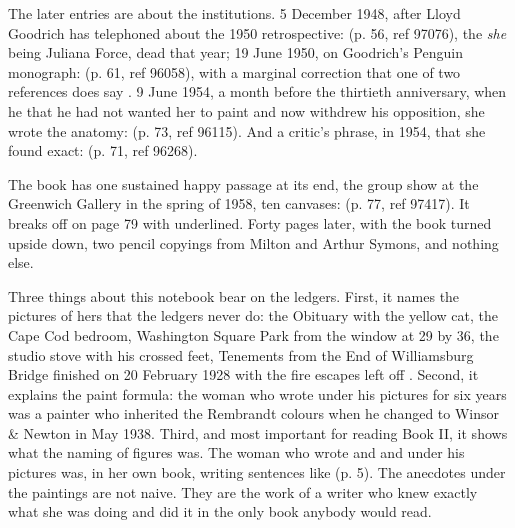 The later entries are about the institutions. 5 December 1948, after Lloyd Goodrich has telephoned about the 1950 retrospective:  (p. 56, ref 97076), the \emph{she} being Juliana Force, dead that year;  19 June 1950, on Goodrich's Penguin monograph:  (p. 61, ref 96058), with a marginal correction that one of two references does say . 9 June 1954, a month before the thirtieth anniversary, when he  that he had not wanted her to paint and now withdrew his opposition, she wrote the anatomy:  (p. 73, ref 96115). And a critic's phrase, in 1954, that she found exact:  (p. 71, ref 96268).

The book has one sustained happy passage at its end, the group show at the Greenwich Gallery in the spring of 1958, ten canvases:  (p. 77, ref 97417). It breaks off on page 79 with  underlined. Forty pages later, with the book turned upside down, two pencil copyings from Milton and Arthur Symons, and nothing else.

Three things about this notebook bear on the ledgers. First, it names the pictures of hers that the ledgers never do: the Obituary with the yellow cat, the Cape Cod bedroom, Washington Square Park from the window at 29 by 36, the studio stove with his crossed feet, Tenements from the End of Williamsburg Bridge finished on 20 February 1928 with the fire escapes left off . Second, it explains the paint formula: the woman who wrote  under his pictures for six years was a painter who inherited the Rembrandt colours when he changed to Winsor \& Newton in May 1938. Third, and most important for reading Book II, it shows what the naming of figures was. The woman who wrote  and  and  under his pictures was, in her own book, writing sentences like  (p. 5). The anecdotes under the paintings are not naive. They are the work of a writer who knew exactly what she was doing and did it in the only book anybody would read.

